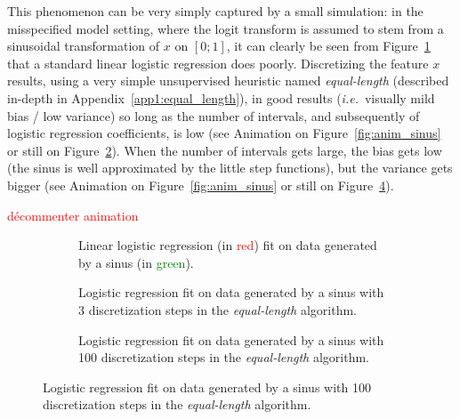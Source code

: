 This phenomenon can be very simply captured by a small simulation: in the misspecified model setting, where the logit transform is assumed to stem from a sinusoidal transformation of $x$ on $[0;1]$, it can clearly be seen from Figure~\ref{fig:sinus_lin} that a standard linear logistic regression does poorly. Discretizing the feature $x$ results, using a very simple unsupervised heuristic named \textit{equal-length} (described in-depth in Appendix~\ref{app1:equal_length}), in good results (\textit{i.e.}\ visually mild bias / low variance) so long as the number of intervals, and subsequently of logistic regression coefficients, is low (see Animation on Figure~\ref{fig:anim_sinus} or still on Figure~\ref{fig:sinus_deb}). When the number of intervals gets large, the bias gets low (the sinus is well approximated by the little step functions), but the variance gets bigger (see Animation on Figure~\ref{fig:anim_sinus} or still on Figure~\ref{fig:sinus_fin}).


\textcolor{red}{décommenter animation}


\begin{figure}[!h]
\vspace*{-1cm}
\begin{subfigure}[t]{\textwidth}
\resizebox{\textwidth}{7cm}{}
\vspace*{-1cm}
\caption{\label{fig:sinus_lin} Linear logistic regression (in \textcolor{red}{red}) fit on data generated by a sinus (in \textcolor{green}{green}).}
\end{subfigure}
\vspace*{-1cm}
\begin{subfigure}[t]{\textwidth}
\resizebox{\textwidth}{7cm}{}
\vspace*{-1cm}
\caption{\label{fig:sinus_deb} Logistic regression fit on data generated by a sinus with 3 discretization steps in the \textit{equal-length} algorithm.}
\end{subfigure}
\vspace*{-1cm}
\begin{subfigure}[t]{\textwidth}
\resizebox{\textwidth}{7cm}{}
\vspace*{-1cm}
\caption{\label{fig:sinus_fin} Logistic regression fit on data generated by a sinus with 100 discretization steps in the \textit{equal-length} algorithm.}
\end{subfigure}
\end{figure}
 
